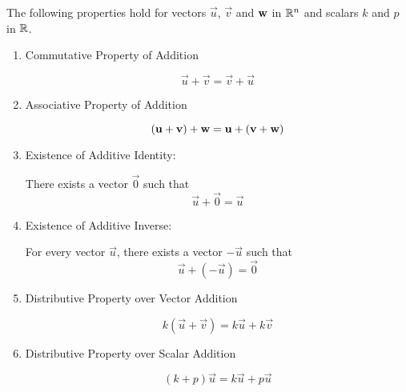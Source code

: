 \documentclass{ximera}
\begin{document}
The following properties hold for vectors $\vec{u}$, $\vec{v}$ and ${\bf w}$ in $\RR^n$ and scalars $k$ and $p$ in $\RR$.
  \begin{enumerate}
  \item 
  Commutative Property of Addition
\begin{expandable}  
  $$\vec{u}+\vec{v}=\vec{v}+\vec{u}$$
\end{expandable}  

  \item 
  Associative Property of Addition
  \begin{expandable}
  $$(\vec{u}+\vec{v})+{\bf w}=\vec{u}+(\vec{v}+{\bf w})$$
   \end{expandable}

  \item 
  Existence of Additive Identity: 
  \begin{expandable}There exists a vector $\vec{0}$ such that
  $$\vec{u}+\vec{0}=\vec{u}$$
  \end{expandable}

  \item 
  Existence of Additive Inverse: 
  \begin{expandable}For every vector $\vec{u}$, there exists a vector $-\vec{u}$ such that
  $$\vec{u}+(-\vec{u})=\vec{0}$$
  \end{expandable}

  \item
  Distributive Property over Vector Addition
  \begin{expandable}
  $$k(\vec{u}+\vec{v})=k\vec{u}+k\vec{v}$$
  \end{expandable}

  \item
  Distributive Property over Scalar Addition
  \begin{expandable}
  $$(k+p)\vec{u}=k\vec{u}+p\vec{u}$$
  \end{expandable}


\end{enumerate}
\end{document}
